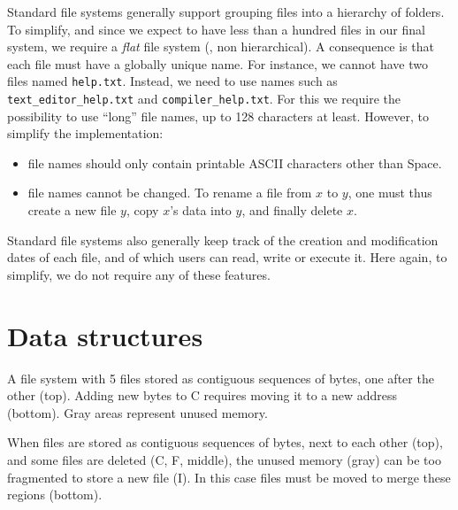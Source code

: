 Standard file systems generally support grouping files into a hierarchy of
folders. To simplify, and since we expect to have less than a hundred files in
our final system, we require a {\em flat} file system (\ie, non hierarchical).
A consequence is that each file must have a globally unique name. For instance,
we cannot have two files named {\tt help.txt}. Instead, we need to use names
such as {\tt text\_editor\_help.txt} and {\tt compiler\_help.txt}. For this we
require the possibility to use ``long'' file names, up to 128 characters at
least. However, to simplify the implementation:
\begin{itemize}
  \item file names should only contain printable ASCII characters other than
  Space.

  \item file names cannot be changed. To rename a file from $x$ to $y$, one
  must thus create a new file $y$, copy $x$'s data into $y$, and finally delete
  $x$.
\end{itemize}

Standard file systems also generally keep track of the creation and
modification dates of each file, and of which users can read, write or execute
it. Here again, to simplify, we do not require any of these features.

\section{Data structures}

\begin{Figure}
  

  \caption{A file system with 5 files stored as contiguous sequences of bytes,
  one after the other (top). Adding new bytes to C requires moving it to a new
  address (bottom). Gray areas represent unused
  memory.}\label{fig:compact-linear-fs}
\end{Figure}

\begin{Figure}
  

  \caption{When files are stored as contiguous sequences of bytes, next to each
  other (top), and some files are deleted (C, F, middle), the unused memory
  (gray) can be too fragmented to store a new file (I). In this case files must
  be moved to merge these regions (bottom).}\label{fig:fragmented-linear-fs}
\end{Figure}

